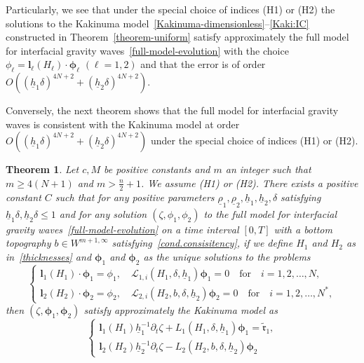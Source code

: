 \documentclass[11pt,leqno]{article}
\newtheorem{theorem}{\bf Theorem}[section]
\numberwithin{equation}{section}
\numberwithin{figure}{section}
\begin{document}
Particularly, we see that under the special choice of indices (H1) or (H2) the solutions to the Kakinuma model~\eqref{Kakinuma-dimensionless}--\eqref{Kaki:IC}
constructed in Theorem~\ref{theorem-uniform} satisfy approximately the full model for interfacial gravity 
waves~\eqref{full-model-evolution} with the choice $\phi_\ell=\bm{l}_\ell(H_\ell)\cdot\bm{\phi}_\ell$ $(\ell=1,2)$ and that 
the error is of order $O((\underline{h}_1\delta)^{4N+2}+(\underline{h}_2\delta)^{4N+2})$. 

Conversely, the next theorem shows that the full model for interfacial gravity waves is consistent with the 
Kakinuma model at order $O((\underline{h}_1\delta)^{4N+2}+(\underline{h}_2\delta)^{4N+2})$ 
under the special choice of indices (H1) or (H2). 


\begin{theorem}\label{theorem-consistency2}
Let $c, M$ be positive constants and $m$ an integer such that $m \geq 4(N+1)$ and $m>\frac{n}{2}+1$. 
We assume {\rm (H1)} or {\rm (H2)}. 
There exists a positive constant $C$ such that for any positive parameters 
$\underline{\rho}_1, \underline{\rho}_2, \underline{h}_1, \underline{h}_2, \delta$ 
satisfying $\underline{h}_1\delta, \underline{h}_2\delta \leq 1$ and for any 
solution $(\zeta,\phi_1,\phi_2)$ to the full model for interfacial gravity waves~\eqref{full-model-evolution} 
on a time interval $[0,T]$ with a bottom topography $b\in W^{m+1,\infty}$ satisfying~\eqref{cond.consisitency}, 
if we define $H_1$ and $H_2$ as in~\eqref{thicknesses} and $\bm{\phi}_1$ and $\bm{\phi}_2$ as the unique solutions to the problems 
%
\begin{equation}\label{Conditions}
\begin{cases}
 \bm{l}_1(H_1)\cdot\bm{\phi}_1=\phi_1, \quad \mathcal{L}_{1,i}(H_1,\delta,\underline{h}_1)\bm{\phi}_1=0
  \quad\mbox{for}\quad i=1,2,\ldots,N, \\
 \bm{l}_2(H_2)\cdot\bm{\phi}_2=\phi_2, \quad \mathcal{L}_{2,i}(H_2,b,\delta,\underline{h}_2)\bm{\phi}_2=0
  \quad\mbox{for}\quad i=1,2,\ldots,N^*,
\end{cases}
\end{equation}
%
then $(\zeta,\bm{\phi}_1,\bm{\phi}_2)$ satisfy approximately the Kakinuma model as
%
\[
\begin{cases}
 \displaystyle
 {\bm l}_1(H_1)\underline{h}_1^{-1}
 \partial_t\zeta + L_1(H_1,\delta,\underline{h}_1){\bm \phi}_1
  = \tilde{\bm{\mathfrak{r}}}_1, \\
 \displaystyle
 {\bm l}_2(H_2)\underline{h}_2^{-1}
 \partial_t\zeta - L_2(H_2,b,\delta,\underline{h}_2){\bm \phi}_2

\end{cases}\]
\end{theorem}
\end{document}
